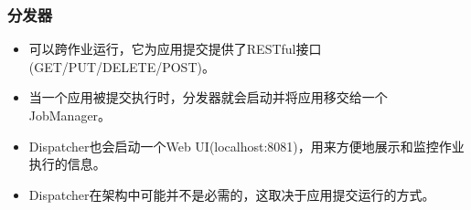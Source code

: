 \documentclass{beamer}
\begin{document}
  \begin{frame}
      \frametitle{分发器}
  
      \begin{itemize}
          \item 可以跨作业运行，它为应用提交提供了RESTful接口(GET/PUT/DELETE/POST)。
          \item 当一个应用被提交执行时，分发器就会启动并将应用移交给一个JobManager。
          \item Dispatcher也会启动一个Web UI(localhost:8081)，用来方便地展示和监控作业执行的信息。
          \item Dispatcher在架构中可能并不是必需的，这取决于应用提交运行的方式。
      \end{itemize}
  
  \end{frame}
\end{document}
